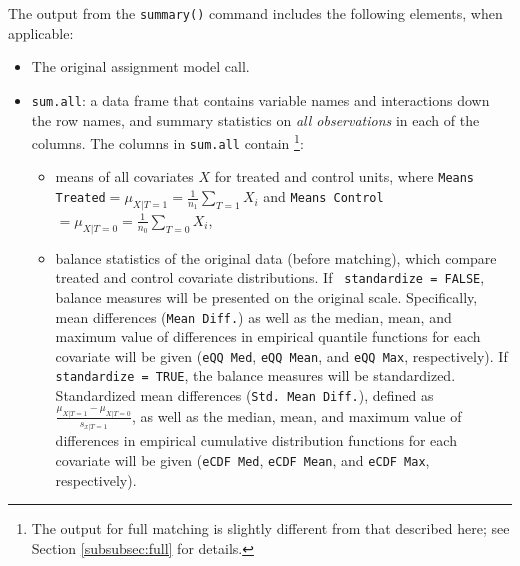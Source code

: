 The output from the \texttt{summary()} command includes the following
elements, when applicable:
\begin{itemize}
\item The original assignment model call.
\item \texttt{sum.all}: a data frame that contains variable names and
  interactions down the row names, and summary statistics on \emph{all
    observations} in each of the columns.  The columns in
  \texttt{sum.all} contain \footnote{The output for full matching is
    slightly different from that described here; see Section
    \ref{subsubsec:full} for details.}:
  \begin{itemize}
  \item means of all covariates $X$ for treated and control units,
    where \texttt{Means Treated}$= \mu_{X|T=1} = \frac{1}{n_1}
    \sum_{T=1} X_i$ and \texttt{Means Control}$= \mu_{X|T=0} =
    \frac{1}{n_0} \sum_{T=0} X_i$,
  \item balance statistics of the original data (before matching),
    which compare treated and control covariate distributions. If {\tt
      standardize = FALSE}, balance measures will be presented on the
    original scale. Specifically, mean differences (\texttt{Mean
      Diff.}) as well as the median, mean, and maximum value of
    differences in empirical quantile functions for each covariate
    will be given (\texttt{eQQ Med}, \texttt{eQQ Mean}, and
    \texttt{eQQ Max}, respectively). If {\tt standardize = TRUE}, the
    balance measures will be standardized.  Standardized mean
    differences (\texttt{Std. Mean Diff.}), defined as
    $\frac{\mu_{X|T=1} - \mu_{X|T=0}}{s_{x|T=1}}$, as well as the
    median, mean, and maximum value of differences in empirical
    cumulative distribution functions for each covariate will be given
    (\texttt{eCDF Med}, \texttt{eCDF Mean}, and \texttt{eCDF Max},
    respectively).
  \end{itemize}
  

\end{itemize}
